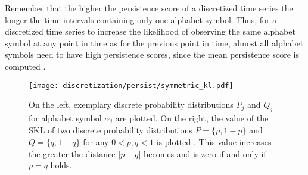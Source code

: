 Remember that the higher the persistence score of a discretized time series the longer the time intervals containing only one alphabet symbol. Thus, for a discretized time series to increase the likelihood of observing the same alphabet symbol at any point in time as for the previous point in time, almost all alphabet symbols need to have high persistence scores, since the mean persistence score is computed \cite{Persist}.
\begin{figure}[htb]
\centering
\texttt{[image: discretization/persist/symmetric\_kl.pdf]}
\caption[Persist - Symmetric Kullback-Leibler Divergence]{On the left, exemplary discrete probability distributions $P_j$ and $Q_j$ for alphabet symbol $\alpha_j$ are plotted. On the right, the value of the \ac{SKL} of two discrete probability distributions $P = \{p,1-p\}$ and $Q = \{q,1-q\}$ for any $0 < p, q < 1$ is plotted \cite{Persist}. This value increases the greater the distance $|p-q|$ becomes and is zero if and only if $p = q$ holds.}
\label{fig:symmetric_kl}
\end{figure}
